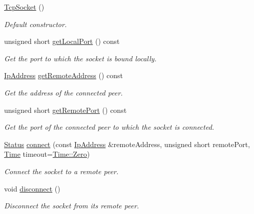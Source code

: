 \begin{DoxyCompactItemize}
\item 
\mbox{\label{classsf_1_1_tcp_socket_a62a9bf81fd7f15fedb29fd1348483236}} 
\hyperlink{classsf_1_1_tcp_socket_a62a9bf81fd7f15fedb29fd1348483236}{Tcp\+Socket} ()
\begin{DoxyCompactList}\small\item\em Default constructor. \end{DoxyCompactList}\item 
unsigned short \hyperlink{classsf_1_1_tcp_socket_a98e45f0f49af1fd99216b9195e86d86b}{get\+Local\+Port} () const
\begin{DoxyCompactList}\small\item\em Get the port to which the socket is bound locally. \end{DoxyCompactList}\item 
\hyperlink{classsf_1_1_ip_address}{Ip\+Address} \hyperlink{classsf_1_1_tcp_socket_aa8579c203b1fd21beb74d7f76444a94c}{get\+Remote\+Address} () const
\begin{DoxyCompactList}\small\item\em Get the address of the connected peer. \end{DoxyCompactList}\item 
unsigned short \hyperlink{classsf_1_1_tcp_socket_a93bced0afd4b1c60797a85725be04951}{get\+Remote\+Port} () const
\begin{DoxyCompactList}\small\item\em Get the port of the connected peer to which the socket is connected. \end{DoxyCompactList}\item 
\hyperlink{classsf_1_1_socket_a51bf0fd51057b98a10fbb866246176dc}{Status} \hyperlink{classsf_1_1_tcp_socket_a68cd42d5ab70ab54b16787f555951c40}{connect} (const \hyperlink{classsf_1_1_ip_address}{Ip\+Address} \&remote\+Address, unsigned short remote\+Port, \hyperlink{classsf_1_1_time}{Time} timeout=\hyperlink{classsf_1_1_time_a8db127b632fa8da21550e7282af11fa0}{Time\+::\+Zero})
\begin{DoxyCompactList}\small\item\em Connect the socket to a remote peer. \end{DoxyCompactList}\item 
void \hyperlink{classsf_1_1_tcp_socket_ac18f518a9be3d6be5e74b9404c253c1e}{disconnect} ()
\begin{DoxyCompactList}\small\item\em Disconnect the socket from its remote peer. \end{DoxyCompactList}\item 

\end{DoxyCompactItemize}
